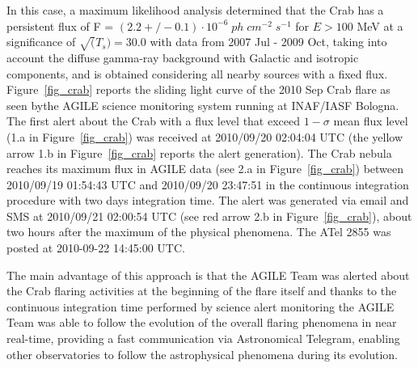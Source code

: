 In this case, a maximum likelihood analysis determined that the Crab has a persistent flux of F = $(2.2 +/- 0.1) \cdot 10^{-6} \; ph \; cm^{-2} \; s^{-1}$ for $E > 100$ MeV at a significance of $\sqrt(T_s) = 30.0$ with data from 2007 Jul - 2009 Oct, taking into account the diffuse gamma-ray background with Galactic and isotropic components, and is obtained considering all nearby sources with a fixed flux. Figure~\ref{fig_crab} reports the sliding light curve of the  2010 Sep Crab flare as seen bythe  AGILE science monitoring system running at INAF/IASF Bologna. The first alert about the Crab with a flux level that exceed $1-\sigma$ mean flux level (1.a in Figure~\ref{fig_crab}) was received at 2010/09/20 02:04:04 UTC (the yellow arrow 1.b in Figure~\ref{fig_crab} reports the alert generation). The Crab nebula reaches its maximum flux in AGILE data (see 2.a in Figure~\ref{fig_crab}) between 2010/09/19 01:54:43 UTC and 2010/09/20 23:47:51 in the continuous integration procedure with two days integration time. The alert was generated via email and SMS at 2010/09/21 02:00:54 UTC (see red arrow 2.b in Figure~\ref{fig_crab}), about two hours after the maximum of the physical phenomena. The ATel 2855 \citep{Tavani:ATEL} was posted at 2010-09-22 14:45:00 UTC.
      
The main advantage  of this approach is that the AGILE Team was alerted about the Crab flaring activities at the beginning of the flare itself and thanks to the continuous integration time performed by science alert monitoring the AGILE Team was able to follow the evolution of the overall flaring phenomena in near real-time, providing a fast communication via Astronomical Telegram, enabling other observatories to follow the astrophysical phenomena during its evolution.
      
